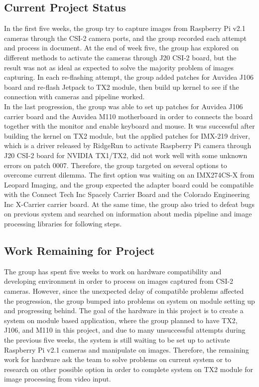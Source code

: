 \documentclass[letterpaper,10pt,serif,draftclsnofoot,onecolumn,compsoc,titlepage]{IEEEtran}
\begin{document}
\subsection{Current Project Status}

In the first five weeks, the group try to capture images from Raspberry Pi v2.1 cameras 
through the CSI-2 camera ports, and the group recorded each attempt and process in document. 
At the end of week five, the group has explored on different methods to activate the cameras 
through J20 CSI-2 board, but the result was not as ideal as expected to solve the majority 
problem of images capturing. In each re-flashing attempt, the group added patches for Auvidea 
J106 board and re-flash Jetpack to TX2 module, then build up kernel to see if the connection 
with cameras and pipeline worked.\\

In the last progression, the group was able to set up patches for Auvidea J106 carrier board 
and the Auvidea M110 motherboard in order to connects the board together with the monitor and 
enable keyboard and mouse. It was successful after building the kernel on TX2 module, but the 
applied patches for IMX-219 driver, which is a driver released by RidgeRun to activate Raspberry 
Pi camera through J20 CSI-2 board for NVIDIA TX1/TX2, did not work well with some unknown errors 
on patch 0007. Therefore, the group targeted on several options to overcome current dilemma. The 
first option was waiting on an IMX274CS-X from Leopard Imaging, and the group expected the adapter 
board could be compatible with the Connect Tech Inc Spacely Carrier Board and the Colorado 
Engineering Inc X-Carrier carrier board. At the same time, the group also tried to defeat bugs 
on previous system and searched on information about media pipeline and image processing libraries 
for following steps.\\

\subsection{Work Remaining for Project}

The group has spent five weeks to work on hardware compatibility and developing environment in order 
to process on images captured from CSI-2 cameras. However, since the unexpected delay of compatible 
problems affected the progression, the group bumped into problems on system on module setting up and 
progressing behind. The goal of the hardware in this project is to create a system on module based 
application, where the group planned to have TX2, J106, and M110 in this project, and due to many 
unsuccessful attempts during the previous five weeks, the system is still waiting to be set up to 
activate Raspberry Pi v2.1 cameras and manipulate on images. Therefore, the remaining work for hardware 
ask the team to solve problems on current system or to research on other possible option in order to 
complete system on TX2 module for image processing from video input.\\
\end{document}
